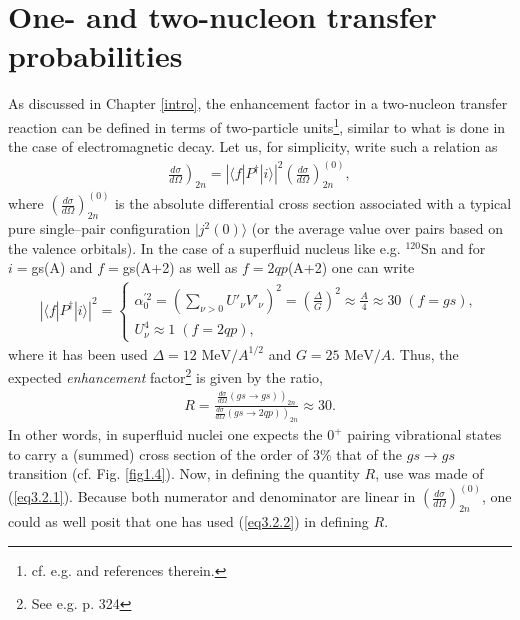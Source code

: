 \section[Transfer probabilities, enhancement factor]{One- and two-nucleon transfer probabilities}\label{C3S2}
As discussed in Chapter \ref{intro}, the enhancement factor in a two-nucleon transfer reaction can be defined in terms of two-particle units\footnote{cf. e.g. \cite{Broglia:72b,Broglia:73} and references therein.}, similar to what is done in the case of electromagnetic decay. Let us, for simplicity, write such a relation as
\begin{align}\label{eq3.2.1}
\left.\frac{d\sigma}{d\Omega}\right)_{2n}=\left|\langle f|P^\dagger|i\rangle \right|^2\left(\frac{d\sigma}{d\Omega}\right)^{(0)}_{2n},
\end{align} 
where $\left(\frac{d\sigma}{d\Omega}\right)^{(0)}_{2n}$ is the absolute differential cross section associated with a typical pure single--pair configuration $|j^2(0)\rangle$ (or the average value over pairs based on the valence orbitals).  In the case of a superfluid nucleus like e.g. $^{120}$Sn and for $i=$gs(A) and $f=$gs(A+2) as well as $f=2qp$(A+2) one can write 
\begin{align}\label{eq3.2.2}
\left|\langle f|P^\dagger|i\rangle \right|^2=\left\{\begin{array}{l}
 \alpha_0^{'2}=\left(\sum_{\nu>0}U'_{\nu}V'_{\nu}\right)^2=\left(\frac{\Delta}{G}\right)^2\approx\frac{A}{4}\approx 30\; (f=gs),\\
 U_\nu^4\approx 1\; (f=2qp),
\end{array} \right.
\end{align} 
where it has been used $\Delta=12\text{ MeV}/A^{1/2}$ and $G=25\text{ MeV}/A$. Thus, the expected \textit{enhancement} factor\footnote{See e.g. \cite{Brink:05} p. 324} is given by the ratio, 
\begin{align}\label{eq3.2.3}
R=\frac{\left.\frac{d\sigma}{d\Omega}(gs\rightarrow gs)\right)_{2n}}{\left.\frac{d\sigma}{d\Omega}(gs\rightarrow 2qp)\right)_{2n}}\approx 30.
\end{align}
In other words, in superfluid nuclei one expects the $0^+$ pairing vibrational states to carry a (summed) cross section of the order of 3\% that of the $gs\rightarrow gs$ transition (cf. Fig. \ref{fig1.4}).
Now, in defining the quantity $R$, use was made of (\ref{eq3.2.1}). Because both numerator and denominator are linear in $\left(\frac{d\sigma}{d\Omega}\right)_{2n}^{(0)}$, one could as well posit that one has used (\ref{eq3.2.2}) in defining $R$.


